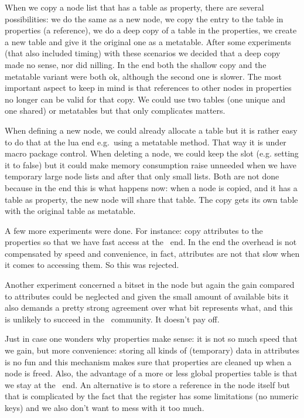 When we copy a node list that has a table as property, there are several
possibilities: we do the same as a new node, we copy the entry to the table in
properties (a reference), we do a deep copy of a table in the properties, we
create a new table and give it the original one as a metatable. After some
experiments (that also included timing) with these scenarios we decided that a
deep copy made no sense, nor did nilling. In the end both the shallow copy and
the metatable variant were both ok, although the second one is slower. The most
important aspect to keep in mind is that references to other nodes in properties
no longer can be valid for that copy. We could use two tables (one unique and one
shared) or metatables but that only complicates matters.

When defining a new node, we could already allocate a table but it is rather easy
to do that at the lua end e.g.\ using a metatable  method. That
way it is under macro package control. When deleting a node, we could keep the
slot (e.g. setting it to false) but it could make memory consumption raise
unneeded when we have temporary large node lists and after that only small lists.
Both are not done because in the end this is what happens now: when a node is
copied, and it has a table as property, the new node will share that table. The
copy gets its own table with the original table as metatable.

A few more experiments were done. For instance: copy attributes to the properties
so that we have fast access at the \LUA\ end. In the end the overhead is not
compensated by speed and convenience, in fact, attributes are not that slow when
it comes to accessing them. So this was rejected.

Another experiment concerned a bitset in the node but again the gain compared to
attributes could be neglected and given the small amount of available bits it also
demands a pretty strong agreement over what bit represents what, and this is
unlikely to succeed in the \TEX\ community. It doesn't pay off.

Just in case one wonders why properties make sense: it is not so much speed that
we gain, but more convenience: storing all kinds of (temporary) data in attributes
is no fun and this mechanism makes sure that properties are cleaned up when a
node is freed. Also, the advantage of a more or less global properties table is
that we stay at the \LUA\ end. An alternative is to store a reference in the node
itself but that is complicated by the fact that the register has some limitations
(no numeric keys) and we also don't want to mess with it too much.

\stopsubsection

\stopsection

\stopdocument
